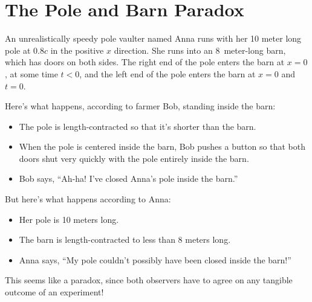 \section{The Pole and Barn Paradox}

\makelabheader %

\bigskip

An unrealistically speedy pole vaulter named Anna runs with her 10 meter long pole at $0.8 c$ in the positive $x$ direction. She runs into an 8~meter-long barn, which has doors on both sides.  The right end of the pole enters the barn at $x = 0$, at some time $t < 0$, and the left end of the pole enters the barn at $x = 0$ and $t = 0$.

Here's what happens, according to farmer Bob, standing inside the barn:
\begin{itemize}[nosep]
\item The pole is length-contracted so that it's shorter than the barn.
\item When the pole is centered inside the barn, Bob pushes a button so that both doors shut very quickly with the pole entirely inside the barn.
\item Bob says, ``Ah-ha! I've closed Anna's pole inside the barn.''
\end{itemize}

But here's what happens according to Anna:
\begin{itemize}[nosep]
\item Her pole is 10 meters long.
\item The barn is length-contracted to less than 8 meters long.
\item Anna says, ``My pole couldn't possibly have been closed inside the barn!''
\end{itemize}

This seems like a paradox, since both observers have to agree on any tangible outcome of an experiment!


